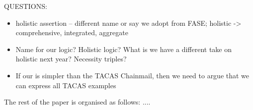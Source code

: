  QUESTIONS:
 \begin{itemize}
 \item
 holistic assertion -- different name or say we adopt from FASE; holistic -> comprehensive, integrated, aggregate
 \item
 Name for our logic?  Holistic logic? What is we have a different take on holistic next year? Necessity triples?
\item
If our \Chainmail is simpler than the TACAS Chainmail, then we need to argue that we can express all TACAS examples
 \end{itemize}
  
The rest of the paper is organised as follows: .... 
